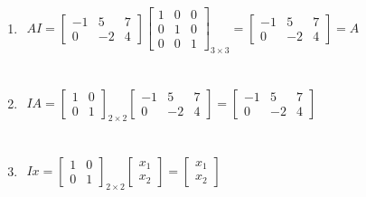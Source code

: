 \documentclass{./../../Latex/handout}
\begin{document}
\begin{enumerate}
\begin{enumerate}

\item $ \begin{aligned} A I=\left[\begin{array}{ccc}-1 & 5 & 7 \\0 & -2 & 4\end{array}\right]\left[\begin{array}{lll}1 & 0 & 0 \\0 & 1 & 0 \\0 & 0 & 1\end{array}\right]_{3 \times 3}  =\left[\begin{array}{ccc}-1 & 5 & 7 \\0 & -2 & 4\end{array}\right]=A \end{aligned}$  \\~\\

\item $ \begin{aligned} IA =\left[\begin{array}{ll}
1 & 0 \\
0 & 1
\end{array}\right]_{2\times 2}\left[\begin{array}{ccc}
-1 & 5 & 7 \\
0 & -2 & 4
\end{array}\right]  =\left[\begin{array}{rrr}
-1 & 5 & 7 \\
0 & -2 & 4
\end{array}\right] \end{aligned}$ \\~\\

\item $ \begin{aligned} Ix=\left[\begin{array}{ll}1 & 0 \\ 0 & 1\end{array}\right]_{2 \times 2}\left[\begin{array}{l}x_{1} \\ x_{2}\end{array}\right]=\left[\begin{array}{l}x_{1} \\ x_{2}\end{array}\right]\end{aligned}$ \\~\\


\end{enumerate}
\end{enumerate}
\end{document}
